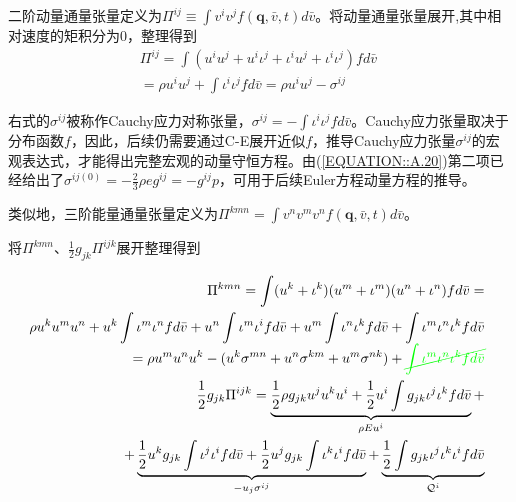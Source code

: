 \documentclass[LBMDerivation.tex]{subfiles}
\begin{document}
二阶动量通量张量定义为$\Pi^{ij} \equiv \int  v^{i} v^{j} f(\boldsymbol{q}, \bar{v}, t)d \bar{v}$。将动量通量张量展开,其中相对速度的矩积分为0，整理得到
\begin{equation}
  \begin{aligned}
    \Pi^{i j}=\int   \left(u^{i} u^{j}+u^{i} \iota^{j}+\iota^{i} u^{j}+\iota^{i} \iota^{j}\right) f  d \bar{v} \\
    =\rho u^{i} u^{j}+\int \iota^{i} \iota^{j} f  d \bar{v} = \rho u^{i} u^{j} -\sigma^{i j}
  \end{aligned}
  \label{EQUATION::动量通量推导} ~
\end{equation}

右式的$\sigma^{i j}$被称作Cauchy应力对称张量，$\sigma^{i j}=-\int \iota^{i} \iota^{j} f  d \bar{v}$。Cauchy应力张量取决于分布函数$f$，因此，后续仍需要通过C-E展开近似$f$，推导Cauchy应力张量$\sigma^{i j}$的宏观表达式，才能得出完整宏观的动量守恒方程。由(\ref{EQUATION::A.20})第二项已经给出了$\sigma^{i j(0)}=-\frac{2}{3}\rho e g^{i j}=- g^{i j}p$，可用于后续Euler方程动量方程的推导。


类似地，三阶能量通量张量定义为$\Pi^{kmn}= \int  v^n v^{m} v^{n} f(\boldsymbol{q}, \bar{v}, t) d \bar{v}$。



将$\Pi^{kmn}$、$\frac{1}{2} g_{jk}\Pi^{i j k}$展开整理得到



\begin{equation}
  \begin{aligned}
    \Pi^{kmn}= \int  (u^k+\iota^k)( u^m + \iota^m )(u^n + \iota^n) f d \bar{v} =                                                       \\  \rho u^k u^m u^n   +  u^k\int \iota^m \iota^n f  d \bar{v} +   u^n \int  \iota^m \iota^{i} f d \bar{v}  +  u^m  \int   \iota^n \iota^{k} f d \bar{v} + \int \iota^m \iota^n  \iota^{k} f  d \bar{v} \\
    = \rho  u^m u^n u^k  - (u^k \sigma^{mn}+u^n \sigma^{km}+u^m \sigma^{nk}) + {\color{green} \cancel{\int \iota^m \iota^n  \iota^{k} f  d \bar{v}}}
    \\
    \frac{1}{2} g_{jk}\Pi^{i j k}
    = \underbrace{\frac{1}{2} \rho g_{jk} u^j u^k u^i  + \frac{1}{2} u^i\int g_{jk} \iota^{j} \iota^{k} f  d \bar{v}}_{\rho  E u^i } + \\
    +  \underbrace{\frac{1}{2} u^k g_{jk}  \int   \iota^{j} \iota^{i} f d \bar{v}  + \frac{1}{2} u^j g_{jk}  \int   \iota^{k} \iota^{i} f d \bar{v} }_{ -u_j \sigma^{ij}} +  \underbrace{\frac{1}{2}\int g_{jk} \iota^{j} \iota^{k}  \iota^{i} f  d \bar{v}}_{\mathcal{Q}^i}
  \end{aligned}
  \label{中间过程} ~
\end{equation}
\end{document}
